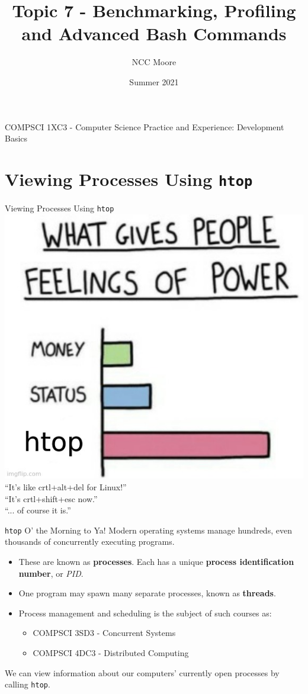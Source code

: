 \documentclass[11pt]{beamer}
\author{NCC Moore}
\title{Topic 7 - Benchmarking, Profiling and Advanced Bash Commands}
\institute{McMaster University}
\date{Summer 2021}
\begin{document}
\begin{frame}
\center
COMPSCI 1XC3 - Computer Science Practice and Experience:
Development Basics
\titlepage
\end{frame}

\begin{frame}
\tableofcontents
\end{frame}

\section[htop]{Viewing Processes Using \texttt{htop}}
\begin{frame}{Viewing Processes Using \texttt{htop}}
\center
\includegraphics[scale=0.25]{htop.jpg} \\
``It's like crtl+alt+del for Linux!''  \\
``It's crtl+shift+esc now.'' \\
``... of course it is.''
\end{frame}

\begin{frame}{\texttt{htop} O' the Morning to Ya!}
Modern operating systems manage hundreds, even thousands of concurrently executing programs.
\begin{itemize}
\item These are known as \textbf{processes}.  Each has a unique \textbf{process identification number}, or \emph{PID}.
\item One program may spawn many separate processes, known as \textbf{threads}.
\item Process management and scheduling is the subject of such courses as:
\begin{itemize}
\item COMPSCI 3SD3 - Concurrent Systems
\item COMPSCI 4DC3 - Distributed Computing
\end{itemize}
\end{itemize}
We can view information about our computers' currently open processes by calling \texttt{htop}.
\end{frame}
\end{document}
